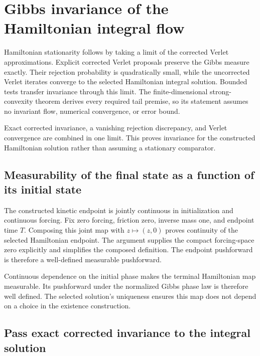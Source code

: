 \documentclass[11pt,a4paper]{report}
\begin{document}
\section{\texorpdfstring{Gibbs invariance of the Hamiltonian integral flow}{Gibbs invariance of the Hamiltonian integral flow}}
\label{proof-module-KineticLangevin-HamiltonianStationarity-lean}


Hamiltonian stationarity follows by taking a limit of the corrected Verlet approximations. Explicit corrected Verlet proposals preserve the Gibbs measure exactly. Their rejection probability is quadratically small, while the uncorrected Verlet iterates converge to the selected Hamiltonian integral solution. Bounded tests transfer invariance through this limit. The finite-dimensional strong-convexity theorem derives every required tail premise, so its statement assumes no invariant flow, numerical convergence, or error bound.



Exact corrected invariance, a vanishing rejection discrepancy, and Verlet convergence are combined in one limit. This proves invariance for the constructed Hamiltonian solution rather than assuming a stationary comparator.

\subsection{\texorpdfstring{Measurability of the final state as a function of its initial state}{Measurability of the final state as a function of its initial state}}
\label{report-step-KineticLangevin-HamiltonianStationarity-lean-1}


The constructed kinetic endpoint is jointly continuous in initialization and continuous forcing. Fix zero forcing, friction zero, inverse mass one, and endpoint time \(T\). Composing this joint map with \(z\mapsto(z,0)\) proves continuity of the selected Hamiltonian endpoint. The argument supplies the compact forcing-space zero explicitly and simplifies the composed definition. The endpoint pushforward is therefore a well-defined measurable pushforward.



Continuous dependence on the initial phase makes the terminal Hamiltonian map measurable. Its pushforward under the normalized Gibbs phase law is therefore well defined. The selected solution’s uniqueness ensures this map does not depend on a choice in the existence construction.

\subsection{\texorpdfstring{Pass exact corrected invariance to the integral solution}{Pass exact corrected invariance to the integral solution}}
\label{report-step-KineticLangevin-HamiltonianStationarity-lean-2}
\end{document}
